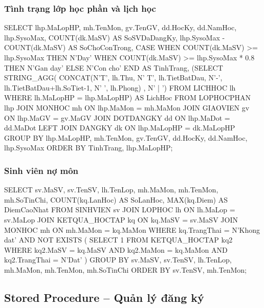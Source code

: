 \documentclass[13pt, a4paper]{article}
\begin{document}
\subsubsection{Tình trạng lớp học phần và lịch học}

\begin{sqlbox}
SELECT lhp.MaLopHP, mh.TenMon, gv.TenGV,
       dd.HocKy, dd.NamHoc,
       lhp.SysoMax,
       COUNT(dk.MaSV)                              AS SoSVDaDangKy,
       lhp.SysoMax - COUNT(dk.MaSV)               AS SoChoConTrong,
       CASE
           WHEN COUNT(dk.MaSV) >= lhp.SysoMax           THEN N'Day'
           WHEN COUNT(dk.MaSV) >= lhp.SysoMax * 0.8     THEN N'Gan day'
           ELSE                                                N'Con cho'
       END AS TinhTrang,
       (SELECT STRING_AGG(
                  CONCAT(N'T', lh.Thu, N' T', lh.TietBatDau,
                         N'-', lh.TietBatDau+lh.SoTiet-1, N' ', lh.Phong)
               , N' | ')
        FROM LICHHOC lh WHERE lh.MaLopHP = lhp.MaLopHP) AS LichHoc
FROM   LOPHOCPHAN  lhp
JOIN   MONHOC      mh  ON lhp.MaMon   = mh.MaMon
JOIN   GIAOVIEN    gv  ON lhp.MaGV    = gv.MaGV
JOIN   DOTDANGKY   dd  ON lhp.MaDot   = dd.MaDot
LEFT JOIN DANGKY   dk  ON lhp.MaLopHP = dk.MaLopHP
GROUP  BY lhp.MaLopHP, mh.TenMon, gv.TenGV, dd.HocKy, dd.NamHoc, lhp.SysoMax
ORDER  BY TinhTrang, lhp.MaLopHP;
\end{sqlbox}

\subsubsection{Sinh viên nợ môn}

\begin{sqlbox}
SELECT sv.MaSV, sv.TenSV, lh.TenLop,
       mh.MaMon, mh.TenMon, mh.SoTinChi,
       COUNT(kq.LanHoc)  AS SoLanHoc,
       MAX(kq.Diem)       AS DiemCaoNhat
FROM   SINHVIEN sv
JOIN   LOPHOC          lh  ON lh.MaLop  = sv.MaLop
JOIN   KETQUA_HOCTAP   kq  ON kq.MaSV   = sv.MaSV
JOIN   MONHOC          mh  ON mh.MaMon  = kq.MaMon
WHERE  kq.TrangThai = N'Khong dat'
  AND  NOT EXISTS (
      SELECT 1 FROM KETQUA_HOCTAP kq2
      WHERE kq2.MaSV = kq.MaSV AND kq2.MaMon = kq.MaMon
        AND kq2.TrangThai = N'Dat'
  )
GROUP BY sv.MaSV, sv.TenSV, lh.TenLop, mh.MaMon, mh.TenMon, mh.SoTinChi
ORDER BY sv.TenSV, mh.TenMon;
\end{sqlbox}

\subsection{Stored Procedure -- Quản lý đăng ký}
\end{document}

